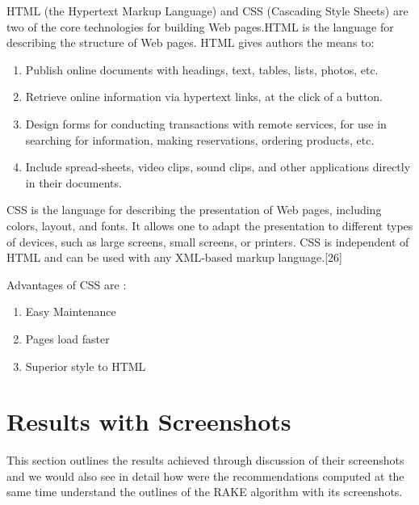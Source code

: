 \documentclass[a4paper,12pt]{report}
\begin{document}
\par HTML (the Hypertext Markup Language) and CSS (Cascading Style Sheets) are two of the core technologies for building Web pages.HTML is the language for describing the structure of Web pages. HTML gives authors the means to: \\
\begin{enumerate}
  \item Publish online documents with headings, text, tables, lists, photos, etc.
  \item Retrieve online information via hypertext links, at the click of a button.
  \item Design forms for conducting transactions with remote services, for use in searching for information, making reservations, ordering products, etc.
  \item Include spread-sheets, video clips, sound clips, and other applications directly in their documents.
\end{enumerate}

\par CSS is the language for describing the presentation of Web pages, including colors, layout, and fonts. It allows one to adapt the presentation to different types of devices, such as large screens, small screens, or printers. CSS is independent of HTML and can be used with any XML-based markup language.[26] \\

\par Advantages of CSS are :
\begin{enumerate}
  \item Easy Maintenance
  \item Pages load faster
  \item Superior style to HTML
\end{enumerate}



\section{Results with Screenshots}
\par This section outlines the results achieved through discussion of their screenshots and we would also see in detail how were the recommendations computed at the same time understand the outlines of the RAKE algorithm with its screenshots.\\
\end{document}
